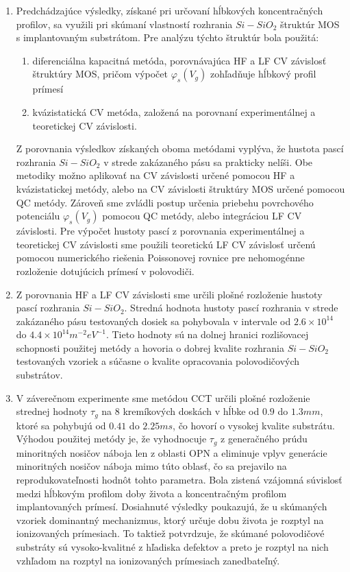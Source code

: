 \begin{enumerate}
\item Predchádzajúce výsledky, získané pri určovaní hĺbkových
  koncentračných profilov, sa využili pri skúmaní vlastností rozhrania
  $Si-SiO_{2}$ štruktúr MOS s implantovaným substrátom. Pre analýzu
  týchto štruktúr bola použitá:

  \begin{enumerate}
  \item diferenciálna kapacitná metóda, porovnávajúca HF a LF CV
    závislosť štruktúry MOS, pričom výpočet $\varphi_{s}(V_{g})$
    zohľadňuje hĺbkový profil prímesí
  \item kvázistatická CV metóda, založená na porovnaní experimentálnej
    a teoretickej CV závislosti.
  \end{enumerate}

Z porovnania výsledkov získaných oboma metódami vyplýva, že hustota
pascí rozhrania $Si-SiO_{2}$ v strede zakázaného pásu sa prakticky
nelíši. Obe metodiky možno aplikovať na CV závislosti určené pomocou
HF a kvázistatickej metódy, alebo na CV závislosti štruktúry MOS
určené pomocou QC metódy. Zároveň sme zvládli postup určenia priebehu
povrchového potenciálu $\varphi_s(V_g)$ pomocou QC metódy, alebo
integráciou LF CV závislosti. Pre výpočet hustoty pascí z porovnania
experimentálnej a teoretickej CV závislosti sme použili teoretickú LF
CV závislosť určenú pomocou numerického riešenia Poissonovej rovnice
pre nehomogénne rozloženie dotujúcich prímesí v polovodiči.

\item Z porovnania HF a LF CV závislosti sme určili plošné rozloženie
  hustoty pascí rozhrania $Si-SiO_{2}$. Stredná hodnota hustoty pascí
  rozhrania v strede zakázaného pásu testovaných dosiek sa pohybovala
  v intervale od $2.6 \times 10^{14}$ do $4.4 \times
  10^{14}m^{-2}eV^{-1}$. Tieto hodnoty sú na dolnej hranici
  rozlišovacej schopnosti použitej metódy a hovoria o dobrej kvalite
  rozhrania $Si-SiO_{2}$ testovaných vzoriek a súčasne o kvalite
  opracovania polovodičových substrátov.

\item V záverečnom experimente sme metódou CCT určili plošné
  rozloženie strednej hodnoty $\tau_{g}$ na 8 kremíkových doskách v
  hĺbke od $0.9$ do $1.3 mm$, ktoré sa pohybujú od $0.41$ do $2.25
  ms$, čo hovorí o vysokej kvalite substrátu.
  Výhodou použitej metódy je, že vyhodnocuje $\tau_{g}$ z
  generačného prúdu minoritných nosičov náboja len z oblasti OPN a
  eliminuje vplyv generácie minoritných nosičov náboja mimo túto
  oblasť, čo sa prejavilo na reprodukovateľnosti hodnôt tohto
  parametra.
  Bola zistená vzájomná súvislosť medzi hĺbkovým profilom doby života
  a koncentračným profilom implantovaných prímesí. Dosiahnuté výsledky
  poukazujú, že u skúmaných vzoriek dominantný mechanizmus, ktorý
  určuje dobu života je rozptyl na ionizovaných prímesiach. To taktiež
  potvrdzuje, že skúmané polovodičové substráty sú vysoko-kvalitné z
  hľadiska defektov a preto je rozptyl na nich vzhľadom na rozptyl na
  ionizovaných prímesiach zanedbateľný.


\end{enumerate}
